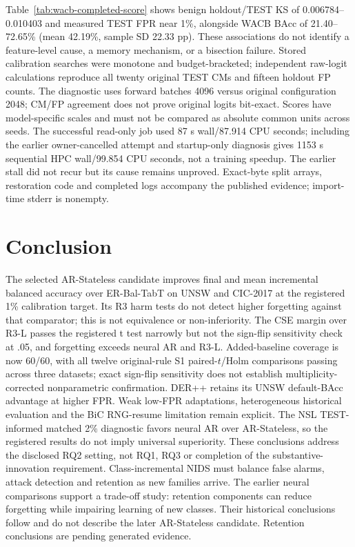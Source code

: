 \documentclass[10pt,twocolumn]{article}
\providecommand{\RetentionConclusionText}{Retention conclusions are pending generated evidence.}
\begin{document}
Table~\ref{tab:wacb-completed-score} shows benign holdout/TEST KS of 0.006784--0.010403 and measured TEST FPR near 1\%, alongside WACB BAcc of 21.40--72.65\% (mean 42.19\%, sample SD 22.33 pp). These associations do not identify a feature-level cause, a memory mechanism, or a bisection failure. Stored calibration searches were monotone and budget-bracketed; independent raw-logit calculations reproduce all twenty original TEST CMs and fifteen holdout FP counts. The diagnostic uses forward batches 4096 versus original configuration 2048; CM/FP agreement does not prove original logits bit-exact. Scores have model-specific scales and must not be compared as absolute common units across seeds. The successful read-only job used 87 s wall/87.914 CPU seconds; including the earlier owner-cancelled attempt and startup-only diagnosis gives 1153 s sequential HPC wall/99.854 CPU seconds, not a training speedup. The earlier stall did not recur but its cause remains unproved. Exact-byte split arrays, restoration code and completed logs accompany the published evidence; import-time stderr is nonempty.



\section{Conclusion}
The selected AR-Stateless candidate improves final and mean incremental balanced accuracy over ER-Bal-TabT on UNSW and CIC-2017 at the registered 1\% calibration target. Its R3 harm tests do not detect higher forgetting against that comparator; this is not equivalence or non-inferiority. The CSE margin over R3-L passes the registered t test narrowly but not the sign-flip sensitivity check at .05, and forgetting exceeds neural AR and R3-L. Added-baseline coverage is now 60/60, with all twelve original-rule S1 paired-$t$/Holm comparisons passing across three datasets; exact sign-flip sensitivity does not establish multiplicity-corrected nonparametric confirmation. DER++ retains its UNSW default-BAcc advantage at higher FPR. Weak low-FPR adaptations, heterogeneous historical evaluation and the BiC RNG-resume limitation remain explicit. The NSL TEST-informed matched 2\% diagnostic favors neural AR over AR-Stateless, so the registered results do not imply universal superiority. These conclusions address the disclosed RQ2 setting, not RQ1, RQ3 or completion of the substantive-innovation requirement.
Class-incremental NIDS must balance false alarms, attack detection and retention as new families arrive. The earlier neural comparisons support a trade-off study: retention components can reduce forgetting while impairing learning of new classes. Their historical conclusions follow and do not describe the later AR-Stateless candidate. \RetentionConclusionText
\end{document}
